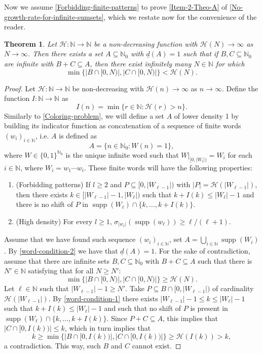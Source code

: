 \documentclass[letter, 11pt]{article}
\theoremstyle{plain} %
\newtheorem{theorem}{Theorem}[section]
\theoremstyle{definition} %
\theoremstyle{plain}
\theoremstyle{plain}
\newcommand{\N}{\mathbb{N}}
\DeclareMathOperator\supp{supp}
\newcommand{\1}{\mathbbm{1}}
\begin{document}
 Now we assume \cref{Forbidding-finite-patterns} to prove \cref{Item-2-Theo-A} of \cref{No-growth-rate-for-infinite-sumsets}, which we restate now for the convenience of the reader. 
 \begingroup
 \def\thetheorem{\ref{No-growth-rate-for-infinite-sumsets} \ref{Item-2-Theo-A}}
\begin{theorem}
    Let $\mathcal{H} : \N \to \N$ be a non-decreasing function with $\mathcal{H} (N) \to \infty $ as $N \to \infty$. Then there exists a set $A \subseteq \N_0$ with $\underline{d}(A) = 1$ such that if $B,C \subseteq \N_0$ are infinite with $B+C \subseteq A$, then there exist infinitely many $N \in \N$ for which 
        \[
         \min{ \{|B \cap [0,N)|, |C \cap [0,N)| \}}<\mathcal{H}(N).
        \]
\end{theorem}
\addtocounter{theorem}{-1} %
\endgroup
\begin{proof}
    Let $\mathcal{H}: \N \to \N$ be non-decreasing with $\mathcal{H}(n) \to \infty $ as $n \to \infty$. Define the function $I:\N\to \N$ as 
    $$I(n)= \min\{ r\in \N: \mathcal{H}(r)>n\}. $$
    Similarly to \cref{Coloring-problem}, we will define a set $A$ of lower density 1 by building its indicator function as concatenation of a sequence of finite words $(w_i)_{i\in \N}$, i.e. $A$ is defined as
    $$A=\{n\in \N_0: W(n)=1\}, $$
    where $W\in \{0,1\}^{\N_0}$ is the unique infinite word such that $W|_{[0,|W_i|)}= W_i$ for each $i\in \N$, where $W_i=w_1\cdots w_i$. These finite words will have the following properties:
    \begin{enumerate}
        \item\label{word-condition-1} (Forbidding patterns) If $l\geq 2$ and $P\subseteq [0,|W_{\ell-1}|)$ with $|P|=\mathcal{H} (|W_{\ell-1}|)$, then there exists $  k\in [|W_{\ell-1}|-1, |W_{\ell}|)  $ such that $k+I(k)\leq |W_{\ell}|-1$ and there is no shift of $P$ in $\supp(W_{\ell})\cap \{k,\ldots, k+I(k)\}$.
        \item\label{word-condition-2} (High density) For every $l\geq 1$, $\sigma_{|w_{\ell}|}(\supp(w_{\ell}))\geq \ell/(\ell+1)$.
    \end{enumerate}
    
    Assume that we have found such sequence $(w_i)_{i\in \N}$, set $A=\bigcup_{i\in \N} \supp(W_i)$. By \cref{word-condition-2} we have that $\underline{d}(A)=1$. For the sake of contradiction, assume that there are infinite sets $B,C\subseteq \N_0$ with $B+C\subseteq A$ such that there is $N'\in \N$ satisfying that for all $N\geq N'$: 
    $$\min\{|B\cap [0,N)|,|C\cap [0,N)|\} \geq \mathcal{H}(N).$$
    Let $\ell\in \N$ such that $|W_{\ell-1}|-1\geq N'$. Take $P\subseteq B\cap [0,|W_{\ell-1}|)$ of cardinality $\mathcal{H}(|W_{\ell-1}|)$. By \cref{word-condition-1} there exists $|W_{\ell-1}|-1\leq k\leq |W_{\ell}|-1$ such that $k+I(k)\leq |W_{\ell}|-1$ and such that no shift of $P$ is present in $\supp(W_{\ell})\cap \{k,\ldots, k+I(k)\}$. Since $P+C\subseteq A$, this implies that $|C\cap [0,I(k))|\leq k$, which in turn implies that
    $$k\geq  \min\{|B\cap [0,I(k))|,|C\cap [0,I(k))|\}\geq  \mathcal{H}(I(k))>k, $$
    a contradiction. This way, such $B$ and $C$ cannot exist.



\end{proof}
\end{document}
